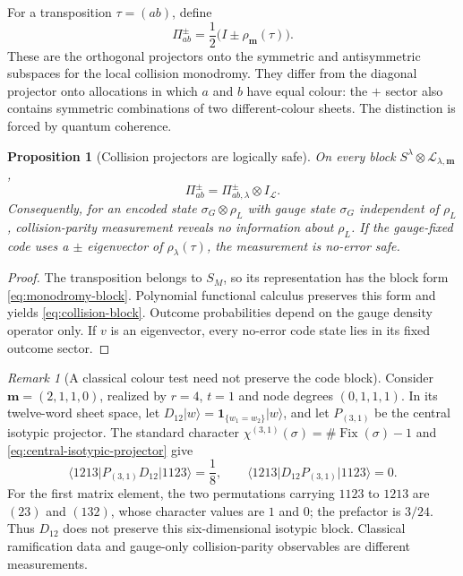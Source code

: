 \documentclass[11pt]{article}
\newtheorem{proposition}[theorem]{Proposition}
\theoremstyle{definition}
\theoremstyle{remark}
\newtheorem{remark}[theorem]{Remark}
\newcommand{\cL}{\mathcal L}
\newcommand{\ket}[1]{\lvert #1\rangle}
\newcommand{\bra}[1]{\langle #1\rvert}
\begin{document}
For a transposition $\tau=(ab)$, define
\begin{equation}\label{eq:collision-projectors}
 \Pi_{ab}^{\pm}=\frac12\big(I\pm\rho_{\boldsymbol m}(\tau)\big).
\end{equation}
These are the orthogonal projectors onto the symmetric and antisymmetric subspaces for the local collision monodromy.  They differ from the diagonal projector onto allocations in which $a$ and $b$ have equal colour: the $+$ sector also contains symmetric combinations of two different-colour sheets.  The distinction is forced by quantum coherence.

\begin{proposition}[Collision projectors are logically safe]\label{prop:collision-safe}
On every block $S^\lambda\otimes\cL_{\lambda,\boldsymbol m}$,
\begin{equation}\label{eq:collision-block}
 \Pi_{ab}^{\pm}=\Pi_{ab,\lambda}^{\pm}\otimes I_{\cL}.
\end{equation}
Consequently, for an encoded state $\sigma_G\otimes\rho_L$ with gauge state $\sigma_G$ independent of $\rho_L$, collision-parity measurement reveals no information about $\rho_L$.  If the gauge-fixed code uses a $\pm$ eigenvector of $\rho_\lambda(\tau)$, the measurement is no-error safe.
\end{proposition}

\begin{proof}
The transposition belongs to $S_M$, so its representation has the block form \eqref{eq:monodromy-block}.  Polynomial functional calculus preserves this form and yields \eqref{eq:collision-block}.  Outcome probabilities depend on the gauge density operator only.  If $v$ is an eigenvector, every no-error code state lies in its fixed outcome sector.
\end{proof}

\begin{remark}[A classical colour test need not preserve the code block]\label{rem:classical-colour-test}
Consider $\boldsymbol m=(2,1,1,0)$, realized by $r=4$, $t=1$ and node degrees $(0,1,1,1)$.  In its twelve-word sheet space, let $D_{12}\ket w=\mathbf1_{\{w_1=w_2\}}\ket w$, and let $P_{(3,1)}$ be the central isotypic projector.  The standard character $\chi^{(3,1)}(\sigma)=\#\operatorname{Fix}(\sigma)-1$ and \eqref{eq:central-isotypic-projector} give
\[
 \bra{1213}P_{(3,1)}D_{12}\ket{1123}=\frac18,
 \qquad
 \bra{1213}D_{12}P_{(3,1)}\ket{1123}=0.
\]
For the first matrix element, the two permutations carrying $1123$ to $1213$ are $(23)$ and $(132)$, whose character values are $1$ and $0$; the prefactor is $3/24$.  Thus $D_{12}$ does not preserve this six-dimensional isotypic block.  Classical ramification data and gauge-only collision-parity observables are different measurements.
\end{remark}
\end{document}
